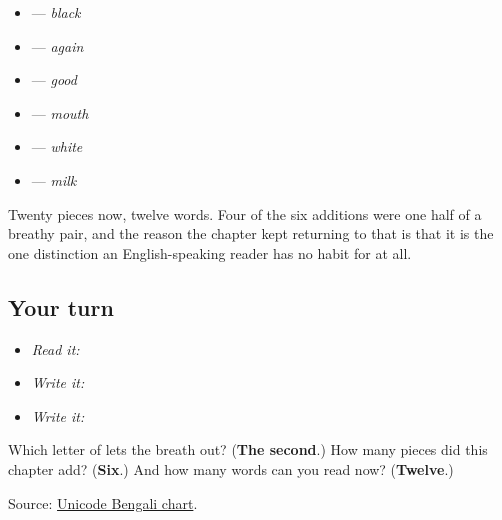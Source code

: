 \begin{itemize}
\raggedright
  \item \textbf{} — \emph{black}
  \item \textbf{} — \emph{again}
  \item \textbf{} — \emph{good}
  \item \textbf{} — \emph{mouth}
  \item \textbf{} — \emph{white}
  \item \textbf{} — \emph{milk}
\end{itemize}

Twenty pieces now, twelve words. Four of the six additions were one half of a breathy pair, and the reason the chapter kept returning to that is that it is the one distinction an English-speaking reader has no habit for at all.

\subsection*{Your turn}
\begin{itemize}
\raggedright
  \item \emph{Read it:}      
  \item \emph{Write it:} 
  \item \emph{Write it:}  
\end{itemize}

\begin{tcolorbox}[breakable,colback=teal!4,colframe=teal!35!black,title={Before you move on}]
Which letter of \textbf{} lets the breath out? (\textbf{The second}.) How many pieces did this chapter add? (\textbf{Six}.) And how many words can you read now? (\textbf{Twelve}.)

Source: \href{https://www.unicode.org/charts/PDF/U0980.pdf}{Unicode Bengali chart}.
\end{tcolorbox}
